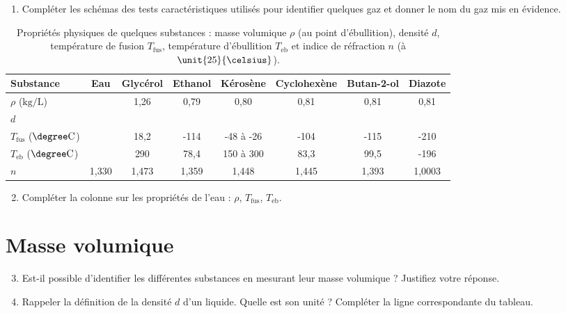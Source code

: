 \begin{enumerate}
\item Compléter les schémas des tests caractéristiques utilisés pour identifier quelques gaz et donner le nom du gaz mis en évidence.
\end{enumerate}

\newpage

\begin{table}[h]
\center
\begin{tabular}{l|c|c|c|c|c|c|c}
Substance & Eau & Glycérol & Ethanol & Kérosène & Cyclohexène & Butan-2-ol & Diazote \\
\hline
\hline
$\rho$ ($\mathrm{kg/L}$) & & 1{,}26 & 0{,}79 & 0{,}80 & 0{,}81 & 0{,}81 & 0{,}81 \\
$d$ & & & & & & \\
$T_\mathrm{fus}$ ($\degree\mathrm{C}$) & & 18{,}2 & -114 & -48 à -26 & -104 & -115 & -210 \\
$T_\mathrm{eb}$ ($\degree\mathrm{C}$) & & 290 & 78{,}4 & 150 à 300 & 83{,}3 & 99{,}5 & -196 \\
$n$ & 1{,}330 & 1{,}473 & 1{,}359 & 1{,}448 & 1{,}445 & 1{,}393 & 1{,}0003
\end{tabular}
\caption{Propriétés physiques de quelques substances : masse volumique $\rho$ (au point d'ébullition), densité $d$, température de fusion $T_\mathrm{fus}$, température d'ébullition $T_\mathrm{eb}$ et indice de réfraction $n$ (à $\unit{25}{\celsius}$).}
\end{table}

\begin{enumerate}
\setcounter{enumi}{1}
\item Compléter la colonne sur les propriétés de l'eau : $\rho$, $T_\mathrm{fus}$, $T_\mathrm{eb}$.
\end{enumerate}

\section*{Masse volumique}

\begin{enumerate}
\setcounter{enumi}{2}
\item Est-il possible d'identifier les différentes substances en mesurant leur masse volumique ?
Justifiez votre réponse.
\item Rappeler la définition de la densité $d$ d'un liquide. Quelle est son unité ? Compléter la ligne correspondante du tableau.
\end{enumerate}


